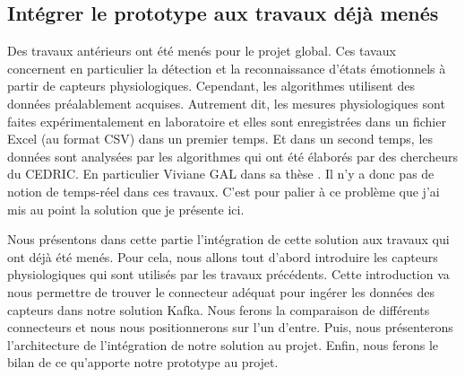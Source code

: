\documentclass[11pt]{article}
\begin{document}
	\subsection{Intégrer le prototype aux travaux déjà menés}\label{sec:travaux}
		Des travaux antérieurs ont été menés pour le projet global.
		Ces tavaux concernent en particulier la détection et la reconnaissance d'états émotionnels à partir de capteurs physiologiques.
		Cependant, les algorithmes utilisent des données préalablement acquises. 
		Autrement dit, les mesures physiologiques sont faites expérimentalement en laboratoire et elles sont enregistrées dans un fichier Excel (au format CSV) dans un premier temps.
		Et dans un second temps, les données sont analysées par les algorithmes qui ont été élaborés par des chercheurs du CEDRIC.
		En particulier Viviane GAL dans sa thèse \cite{gal_2019}.
		Il n'y a donc pas de notion de temps-réel dans ces travaux.
		C'est pour palier à ce problème que j'ai mis au point la solution que je présente ici.\par
		Nous présentons dans cette partie l'intégration de cette solution aux travaux qui ont déjà été menés.
		Pour cela, nous allons tout d'abord introduire les capteurs physiologiques qui sont utilisés par les travaux précédents.
		Cette introduction va nous permettre de trouver le connecteur adéquat pour ingérer les données des capteurs dans notre solution Kafka.
		Nous ferons la comparaison de différents connecteurs et nous nous positionnerons sur l'un d'entre.
		Puis, nous présenterons l'architecture de l'intégration de notre solution au projet.
		Enfin, nous ferons le bilan de ce qu'apporte notre prototype au projet.
\end{document}
